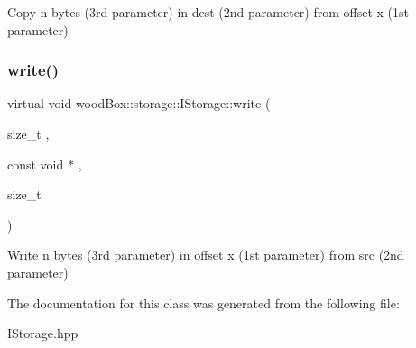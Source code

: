 Copy n bytes (3rd parameter) in dest (2nd parameter) from offset x (1st parameter) \mbox{\label{classwood_box_1_1storage_1_1_i_storage_a5eb82c922e8a3147ddab510706be8e24}} 
\subsubsection{\texorpdfstring{write()}{write()}}
{\footnotesize\ttfamily virtual void wood\+Box\+::storage\+::\+I\+Storage\+::write (\begin{DoxyParamCaption}\item[{size\+\_\+t}]{,  }\item[{const void $\ast$}]{,  }\item[{size\+\_\+t}]{ }\end{DoxyParamCaption})\hspace{0.3cm}{\ttfamily [pure virtual]}}

Write n bytes (3rd parameter) in offset x (1st parameter) from src (2nd parameter) 

The documentation for this class was generated from the following file\+:\begin{DoxyCompactItemize}
\item 
I\+Storage.\+hpp\end{DoxyCompactItemize}

